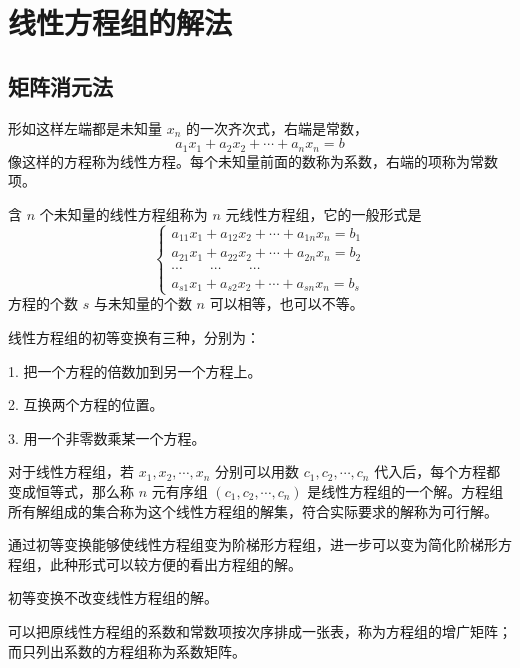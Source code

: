\chapter{线性方程组的解法}

\section{矩阵消元法}

形如这样左端都是未知量 $x_n$ 的一次齐次式，右端是常数，
$$a_1x_1+a_2x_2+\cdots+a_nx_n=b$$
像这样的方程称为线性方程。每个未知量前面的数称为系数，右端的项称为常数项。

含 $n$ 个未知量的线性方程组称为 $n$ 元线性方程组，它的一般形式是
\begin{equation*}
	\left\{
		\begin{matrix}
			a_{11}x_1+a_{12}x_2+\cdots+a_{1n}x_n=b_1\\
			a_{21}x_1+a_{22}x_2+\cdots+a_{2n}x_n=b_2\\
			\cdots\qquad\cdots\qquad\cdots\\
			a_{s1}x_1+a_{s2}x_2+\cdots+a_{sn}x_n=b_s
		\end{matrix}
	\right.
\end{equation*}
方程的个数 $s$ 与未知量的个数 $n$ 可以相等，也可以不等。

\begin{definition}[线性方程组的初等变换]
	线性方程组的初等变换有三种，分别为：
	
	1. 把一个方程的倍数加到另一个方程上。

	2. 互换两个方程的位置。

	3. 用一个非零数乘某一个方程。
\end{definition}

对于线性方程组，若 $x_1,x_2,\cdots,x_n$ 分别可以用数 $c_1,c_2,\cdots,c_n$ 代入后，每个方程都变成恒等式，那么称 $n$ 元有序组 $(c_1,c_2,\cdots,c_n)$ 是线性方程组的一个解。方程组所有解组成的集合称为这个线性方程组的解集，符合实际要求的解称为可行解。

通过初等变换能够使线性方程组变为阶梯形方程组，进一步可以变为简化阶梯形方程组，此种形式可以较方便的看出方程组的解。

\begin{theorem}
	初等变换不改变线性方程组的解。
\end{theorem}

可以把原线性方程组的系数和常数项按次序排成一张表，称为方程组的增广矩阵；而只列出系数的方程组称为系数矩阵。

